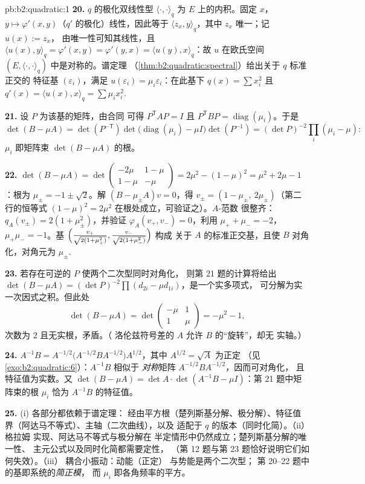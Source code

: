 \begin{solution}{pb:b2:quadratic:1}
\textbf{20.} $q$ 的极化双线性型
$\langle\cdot,\cdot\rangle_q$ 为 $E$ 上的内积。固定 $x$，$y \mapsto
\varphi'(x, y)$（$q'$ 的极化）线性，因此等于
$\langle z_x, y\rangle_q$，其中 $z_x$ 唯一；记 $u(x) := z_x$，
由唯一性可知其线性，且 $\langle u(x), y\rangle_q =
\varphi'(x,y) = \varphi'(y,x) = \langle u(y), x\rangle_q$：故 $u$
在欧氏空间 $(E,
\langle\cdot,\cdot\rangle_q)$ 中是对称的。谱定理
（\cref{thm:b2:quadratic:spectral}）给出关于 $q$ 标准正交的
特征基 $(\varepsilon_i)$，满足 $u(\varepsilon_i) =
\mu_i\varepsilon_i$：在此基下 $q(x) = \sum x_i^2$ 且 $q'(x) =
\langle u(x), x\rangle_q = \sum\mu_ix_i^2$.

\textbf{21.} 设 $P$ 为该基的矩阵，由合同
可得 $P^{\mathsf T}AP = I$ 且 $P^{\mathsf T}BP =
\operatorname{diag}(\mu_i)$。于是
\[
\det(B - \mu A) = \det(P^{-\mathsf T})
\det\bigl(\operatorname{diag}(\mu_i) - \mu I\bigr)
\det(P^{-1})
= (\det P)^{-2}\prod_i(\mu_i - \mu) :
\]
$\mu_i$ 即矩阵束 $\det(B - \mu A)$ 的根。

\textbf{22.} $\det(B - \mu A) =
\det\begin{pmatrix} -2\mu & 1-\mu\\ 1-\mu & -\mu\end{pmatrix}
= 2\mu^2 - (1-\mu)^2 = \mu^2 + 2\mu - 1$：根为 $\mu_\pm = -1
\pm \sqrt2$。解 $(B - \mu_\pm A)v = 0$，得 $v_\pm = (1 -
\mu_\pm,\ 2\mu_\pm)$（第二行的恒等式 $(1-\mu)^2 =
2\mu^2$ 在根处成立，可验证之）。$A$-范数
很整齐：$q_A(v_\pm) = 2(1 + \mu_\pm^2)$，并验证
$\varphi_A(v_+, v_-) = 0$，利用 $\mu_+ + \mu_- = -2$，
$\mu_+\mu_- = -1$。基 $\Bigl(\frac{v_+}{\sqrt{2(1 +
\mu_+^2)}}, \frac{v_-}{\sqrt{2(1+\mu_-^2)}}\Bigr)$ 构成
关于 $A$ 的标准正交基，且使 $B$ 对角化，对角元为
$\mu_\pm$.

\textbf{23.} 若存在可逆的 $P$ 使两个二次型同时对角化，
则第 21 题的计算将给出 $\det(B - \mu A) = (\det
P)^{-2}\prod(d_{2i} - \mu d_{1i})$，是一个实多项式，
可分解为实一次因式之积。但此处
\[
\det(B - \mu A) = \det\begin{pmatrix} -\mu & 1\\ 1 &
\mu\end{pmatrix} = -\mu^2 - 1 ,
\]
次数为 $2$ 且无实根，矛盾。（
洛伦兹符号差的 $A$ 允许 $B$ 的“旋转”，却无
实轴。）

\textbf{24.} $A^{-1}B = A^{-1/2}\bigl(A^{-1/2}BA^{-1/2}\bigr)
A^{1/2}$，其中 $A^{1/2} = \sqrt A$ 为正定
（见\cref{exo:b2:quadratic:6}）：$A^{-1}B$ 相似于
\emph{对称}矩阵 $A^{-1/2}BA^{-1/2}$，因而可对角化，
且特征值为实数。又 $\det(B - \mu A) = \det A\cdot
\det(A^{-1}B - \mu I)$：第 21 题中矩阵束的根 $\mu_i$
恰为 $A^{-1}B$ 的特征值。

\textbf{25.} (i) 各部分都依赖于谱定理：
经由平方根（楚列斯基分解、极分解）、特征值
界（阿达马不等式）、主轴（二次曲线），以及
适配于 $q$ 的版本（同时化简）。（ii）格拉姆
实现、阿达马不等式与极分解在
半定情形中仍然成立；楚列斯基分解的唯一性、
主元公式以及同时化简都需要定性，
（第 12 题与第 23 题恰好说明它们如何失效）。（iii）
耦合小振动：动能（正定）
与势能是两个二次型；
第 20--22 题中的基即系统的\emph{简正模}，
而 $\mu_i$ 即各角频率的平方。
\end{solution}
